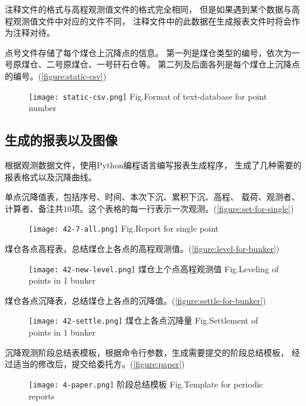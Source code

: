 注释文件的格式与高程观测值文件的格式完全相同，
但是如果遇到某个数据与高程观测值文件中对应的文件不同，
注释文件中的此数据在生成报表文件时将会作为注释对待。

点号文件存储了每个煤仓上沉降点的信息。
第一列是煤仓类型的编号，依次为一号原煤仓、二号原煤仓、一号矸石仓等。
第二列及后面各列是每个煤仓上沉降点的编号。(\ref{figure:static-csv})
\begin{figure}[!htbp]
   \centering
   \texttt{[image: static-csv.png]}
			{Fig.}{Format of text-database for point number}
\end{figure}

\subsection{生成的报表以及图像}
根据观测数据文件，使用Python编程语言编写报表生成程序，
生成了几种需要的报表格式以及沉降曲线。

单点沉降值表，包括序号、时间、本次下沉、累积下沉、高程、
载荷、观测者、计算者、备注共10项。这个表格的每一行表示一次观测。(\ref{figure:set-for-single})
\begin{figure}[!htbp]
   \centering
   \texttt{[image: 42-7-all.png]}
			{Fig.}{Report for single point}
\end{figure}

煤仓各点高程表，总结煤仓上各点的高程观测值。(\ref{figure:level-for-bunker})
\begin{figure}[!htbp]
   \centering
   \texttt{[image: 42-new-level.png]}
					{煤仓上个点高程观测值}
			{Fig.}{Leveling of points in 1 bunker}
\end{figure}

煤仓各点沉降表，总结煤仓上各点的沉降值。(\ref{figure:settle-for-bunker})
\begin{figure}[!htbp]
   \centering
   \texttt{[image: 42-settle.png]}
					{煤仓上各点沉降量}
			{Fig.}{Settlement of points in 1 bunker}
\end{figure}

沉降观测阶段总结表模板，根据命令行参数，生成需要提交的阶段总结模板，
经过适当的修改后，提交给委托方。(\ref{figure:paper})
\begin{figure}[!htbp]
   \centering
   \texttt{[image: 4-paper.png]}
				    {阶段总结模板}
			{Fig.}{Template for periodic reports}
\end{figure}


